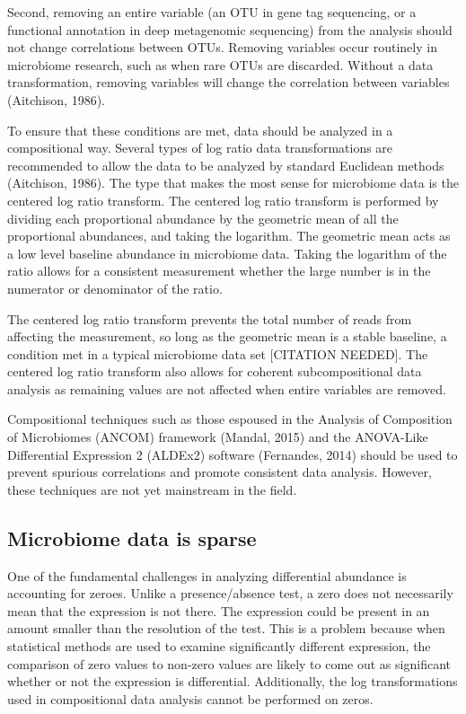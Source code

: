 Second, removing an entire variable (an OTU in gene tag sequencing, or a functional annotation in deep metagenomic sequencing) from the analysis should not change correlations between OTUs. Removing variables occur routinely in microbiome research, such as when rare OTUs are discarded. Without a data transformation, removing variables will change the correlation between variables (Aitchison, 1986).

To ensure that these conditions are met, data should be analyzed in a compositional way. Several types of log ratio data transformations are recommended to allow the data to be analyzed by standard Euclidean methods (Aitchison, 1986). The type that makes the most sense for microbiome data is the centered log ratio transform. The centered log ratio transform is performed by dividing each proportional abundance by the geometric mean of all the proportional abundances, and taking the logarithm. The geometric mean acts as a low level baseline abundance in microbiome data. Taking the logarithm of the ratio allows for a consistent measurement whether the large number is in the numerator or denominator of the ratio.

The centered log ratio transform prevents the total number of reads from affecting the measurement, so long as the geometric mean is a stable baseline, a condition met in a typical microbiome data set [CITATION NEEDED]. The centered log ratio transform also allows for coherent subcompositional data analysis as remaining values are not affected when entire variables are removed.

Compositional techniques such as those espoused in the Analysis of Composition of Microbiomes (ANCOM) framework (Mandal, 2015) and the ANOVA-Like Differential Expression 2 (ALDEx2) software (Fernandes, 2014) should be used to prevent spurious correlations and promote consistent data analysis. However, these techniques are not yet mainstream in the field.

\subsection{Microbiome data is sparse}
One of the fundamental challenges in analyzing differential abundance is accounting for zeroes. Unlike a presence/absence test, a zero does not necessarily mean that the expression is not there. The expression could be present in an amount smaller than the resolution of the test. This is a problem because when statistical methods are used to examine significantly different expression, the comparison of zero values to non-zero values are likely to come out as significant whether or not the expression is differential. Additionally, the log transformations used in compositional data analysis cannot be performed on zeros.

